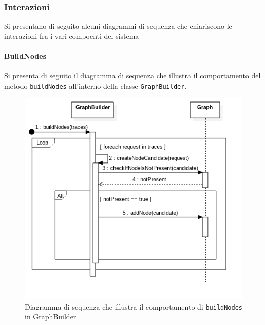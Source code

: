 
\subsubsection{Interazioni}
Si presentano di seguito alcuni diagrammi di sequenza che chiariscono le interazioni fra i vari compoenti del sistema

\paragraph{BuildNodes} \Spazio
Si presenta di seguito il diagramma di sequenza che illustra il comportamento del metodo \texttt{buildNodes} all'interno della classe \texttt{GraphBuilder}.
\begin{figure}[H]
	\centering
	\includegraphics[width=1\textwidth]{Images/SequenceBuildNodes.png}
	\caption{Diagramma di sequenza che illustra il comportamento di \texttt{buildNodes} in GraphBuilder}
	\label{img:sequenceBuildNodes}
\end{figure}

